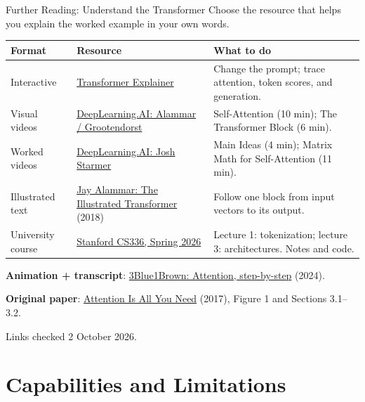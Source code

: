 \documentclass[aspectratio=169]{beamer}
\begin{document}
\begin{frame}{Further Reading: Understand the Transformer}
  \small Choose the resource that helps you explain the worked example in your own words.
  \par\vspace{0.25em}
  {\footnotesize\renewcommand{\arraystretch}{1.05}
  \begin{tabular}{@{}>{\raggedright\arraybackslash}p{2.3cm}>{\raggedright\arraybackslash}p{5.0cm}>{\raggedright\arraybackslash}p{4.8cm}@{}}
    \toprule
    \textbf{Format} & \textbf{Resource} & \textbf{What to do} \\
    \midrule
    Interactive & \href{https://poloclub.github.io/transformer-explainer/}{Transformer Explainer} & Change the prompt; trace attention, token scores, and generation. \\
    Visual videos & \href{https://www.deeplearning.ai/courses/how-transformer-llms-work}{DeepLearning.AI: Alammar / Grootendorst} & Self-Attention (10 min); The Transformer Block (6 min). \\
    Worked videos & \href{https://www.deeplearning.ai/courses/attention-in-transformers-concepts-and-code-in-pytorch}{DeepLearning.AI: Josh Starmer} & Main Ideas (4 min); Matrix Math for Self-Attention (11 min). \\
    Illustrated text & \href{https://jalammar.github.io/illustrated-transformer/}{Jay Alammar: The Illustrated Transformer} (2018) & Follow one block from input vectors to its output. \\
    University course & \href{https://cs336.stanford.edu/}{Stanford CS336, Spring 2026} & Lecture 1: tokenization; lecture 3: architectures. Notes and code. \\
    \bottomrule
  \end{tabular}\par}
  \vspace{0.25em}
  \small \textbf{Animation + transcript}: \href{https://www.3blue1brown.com/lessons/attention/}{3Blue1Brown: Attention, step-by-step} (2024).
  \par\vspace{0.2em}
  \textbf{Original paper}: \href{https://arxiv.org/abs/1706.03762}{Attention Is All You Need} (2017), Figure 1 and Sections 3.1--3.2.
  \par\vspace{0.3em}
  {\scriptsize Links checked 2 October 2026.}
\end{frame}

\section{Capabilities and Limitations}
\end{document}
